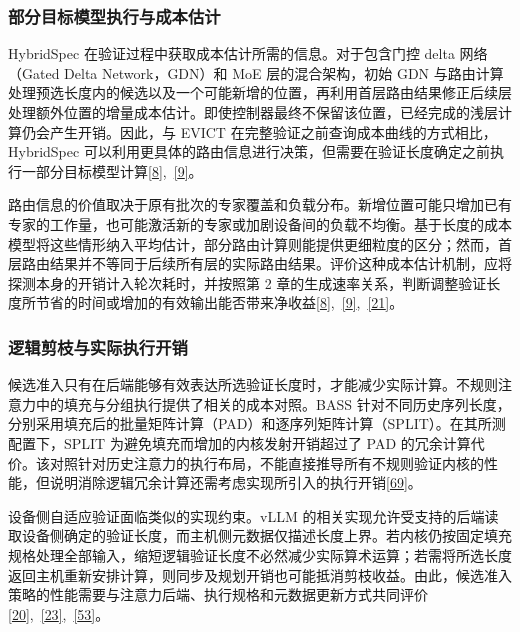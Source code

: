 \documentclass[11pt,a4paper,UTF8,fontset=none,scheme=plain,zihao=-4]{ctexart}
\begin{document}
\hypertarget{section-4-2-2}{%
\subsubsection{部分目标模型执行与成本估计}\label{section-4-2-2}}

HybridSpec 在验证过程中获取成本估计所需的信息。对于包含门控 delta
网络（Gated Delta Network，GDN）和 MoE 层的混合架构，初始 GDN
与路由计算处理预选长度内的候选以及一个可能新增的位置，再利用首层路由结果修正后续层处理额外位置的增量成本估计。即使控制器最终不保留该位置，已经完成的浅层计算仍会产生开销。因此，与
EVICT 在完整验证之前查询成本曲线的方式相比，HybridSpec
可以利用更具体的路由信息进行决策，但需要在验证长度确定之前执行一部分目标模型计算\protect\hyperlink{ref-evict}{{[}8{]}},~\protect\hyperlink{ref-hybridspec}{{[}9{]}}。

路由信息的价值取决于原有批次的专家覆盖和负载分布。新增位置可能只增加已有专家的工作量，也可能激活新的专家或加剧设备间的负载不均衡。基于长度的成本模型将这些情形纳入平均估计，部分路由计算则能提供更细粒度的区分；然而，首层路由结果并不等同于后续所有层的实际路由结果。评价这种成本估计机制，应将探测本身的开销计入轮次耗时，并按照第
2
章的生成速率关系，判断调整验证长度所节省的时间或增加的有效输出能否带来净收益\protect\hyperlink{ref-evict}{{[}8{]}},~\protect\hyperlink{ref-hybridspec}{{[}9{]}},~\protect\hyperlink{ref-moebytes}{{[}21{]}}。

\hypertarget{section-4-2-3}{%
\subsubsection{逻辑剪枝与实际执行开销}\label{section-4-2-3}}

候选准入只有在后端能够有效表达所选验证长度时，才能减少实际计算。不规则注意力中的填充与分组执行提供了相关的成本对照。BASS
针对不同历史序列长度，分别采用填充后的批量矩阵计算（PAD）和逐序列矩阵计算（SPLIT）。在其所测配置下，SPLIT
为避免填充而增加的内核发射开销超过了 PAD
的冗余计算代价。该对照针对历史注意力的执行布局，不能直接推导所有不规则验证内核的性能，但说明消除逻辑冗余计算还需考虑实现所引入的执行开销\protect\hyperlink{ref-bass}{{[}69{]}}。

设备侧自适应验证面临类似的实现约束。vLLM
的相关实现允许受支持的后端读取设备侧确定的验证长度，而主机侧元数据仅描述长度上界。若内核仍按固定填充规格处理全部输入，缩短逻辑验证长度不必然减少实际算术运算；若需将所选长度返回主机重新安排计算，则同步及规划开销也可能抵消剪枝收益。由此，候选准入策略的性能需要与注意力后端、执行规格和元数据更新方式共同评价\protect\hyperlink{ref-vllmgraphdocs}{{[}20{]}},~\protect\hyperlink{ref-dspark}{{[}23{]}},~\protect\hyperlink{ref-avdocs}{{[}53{]}}。
\end{document}

